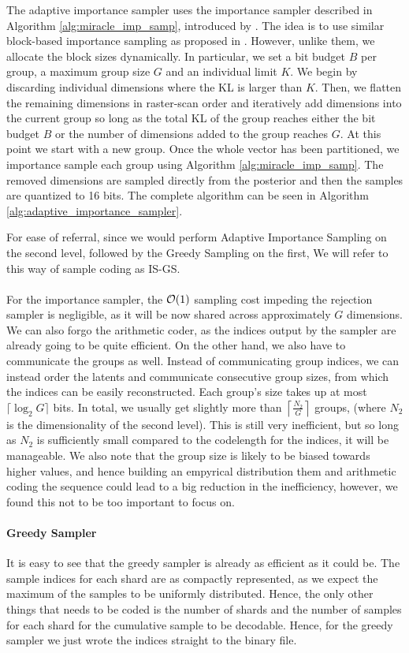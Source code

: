 The adaptive importance sampler uses the importance sampler described in
Algorithm \ref{alg:miracle_imp_samp}, introduced by \cite{havasi2018minimal}.
The idea is to use similar block-based importance sampling as proposed in
\cite{havasi2018minimal}. However, unlike them, we allocate the block sizes
dynamically. In particular, we set a bit budget $B$ per group, a maximum group
size $G$ and an individual limit $K$.
We begin by discarding individual dimensions where the KL is larger
than $K$. Then, we flatten the remaining dimensions in raster-scan order and 
iteratively add dimensions into the current group so long as the total KL of the
group reaches either the bit budget $B$ or the number of dimensions added to the
group reaches $G$. At this point we start with a new group. Once the whole
vector has been partitioned, we importance sample each group using Algorithm 
\ref{alg:miracle_imp_samp}. The removed dimensions are sampled directly from
the posterior and then the samples are quantized to 16 bits. The complete
algorithm can be seen in Algorithm \ref{alg:adaptive_importance_sampler}.
\par
For ease of referral, since we would perform Adaptive Importance Sampling on the
second level, followed by the Greedy Sampling on the first, We will refer to
this way of sample coding as IS-GS.

\paragraph{}
For the importance sampler, the $\mathcal{O}(1)$ sampling cost impeding the rejection
sampler is negligible, as it will be now shared across approximately $G$
dimensions. We can also forgo the arithmetic coder, as the indices output by the
sampler are already going to be quite efficient. On the other hand, we also
have to communicate the groups as well. Instead of communicating
group indices, we can instead order the latents and communicate consecutive
group sizes, from which the indices can be easily reconstructed. Each
group's size takes up at most $\lceil \log_2G \rceil$ bits. In total, we usually
get slightly more than $\left\lceil \frac{N_2}{G} \right\rceil$ groups,
(where $N_2$ is the dimensionality of the second level). This is still
very inefficient, but so long as $N_2$ is sufficiently small compared to the
codelength for the indices, it will be manageable. We also note that the group
size is likely to be biased towards higher values, and hence building an
empyrical distribution them and arithmetic coding the sequence could lead to a
big reduction in the inefficiency, however, we found this not to be too
important to focus on. 

\paragraph{Greedy Sampler} It is easy to see that the greedy sampler is already
as efficient as it could be. The sample indices for each shard are as compactly
represented, as we expect the maximum of the samples to be uniformly
distributed. Hence, the only other things that needs to be coded is the number
of shards and the number of samples for each shard for the cumulative sample to
be decodable. Hence, for the greedy sampler we just wrote the indices straight
to the binary file.
